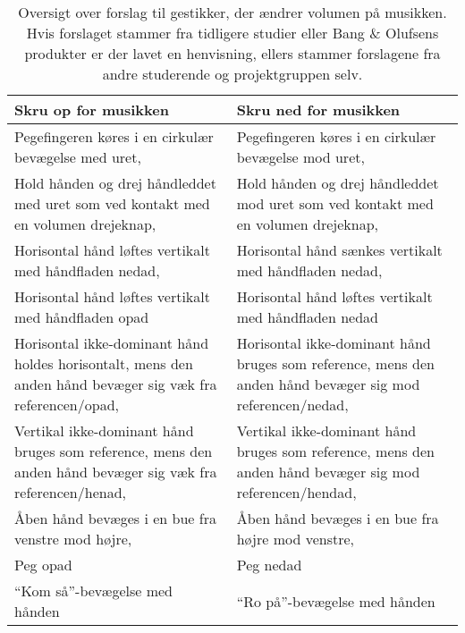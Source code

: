 %
\begin{table}[H]
	\centering
	\begin{tabular}{| p{6cm} | p{6cm} |}
		\hline
		\textbf{Skru op for musikken} & \textbf{Skru ned for musikken} \\ \hline
		Pegefingeren køres i en cirkulær bevægelse med uret, \parencite{WEB:BeosoundMoment, WEB:BMW7} & Pegefingeren køres i en cirkulær bevægelse mod uret, \parencite{WEB:BeosoundMoment, WEB:BMW7} \\ \hline
		Hold hånden og drej håndleddet med uret som ved kontakt med en volumen drejeknap, \parencite{WEB:Beosound2} & Hold hånden og drej håndleddet mod uret som ved kontakt med en volumen drejeknap, \parencite{WEB:Beosound2} \\ \hline
		Horisontal hånd løftes vertikalt med håndfladen nedad, \parencite[s. 166]{PDF:ComparingInputModalities} & Horisontal hånd sænkes vertikalt med håndfladen nedad, \parencite[s. 166]{PDF:ComparingInputModalities} \\ \hline
		Horisontal hånd løftes vertikalt med håndfladen opad & Horisontal hånd løftes vertikalt med håndfladen nedad \\ \hline
		Horisontal ikke-dominant hånd holdes horisontalt, mens den anden hånd bevæger sig væk fra referencen/opad, \parencite[s. 48]{PDF:UserDefinedGesturesTV} & Horisontal ikke-dominant hånd bruges som reference, mens den anden hånd bevæger sig mod referencen/nedad, \parencite[s. 48]{PDF:UserDefinedGesturesTV} \\ \hline
		Vertikal ikke-dominant hånd bruges som reference, mens den anden hånd bevæger sig væk fra referencen/henad, \parencite[s. 48]{PDF:UserDefinedGesturesTV} & Vertikal ikke-dominant hånd bruges som reference, mens den anden hånd bevæger sig mod referencen/hendad, \parencite[s. 48]{PDF:UserDefinedGesturesTV} \\ \hline
		Åben hånd bevæges i en bue fra venstre mod højre, \parencite{WEB:BeoplayA9} & Åben hånd bevæges i en bue fra højre mod venstre, \parencite{WEB:BeoplayA9} \\ \hline
		Peg opad & Peg nedad \\ \hline
		\enquote{Kom så}-bevægelse med hånden & \enquote{Ro på}-bevægelse med hånden \\ \hline		
	\end{tabular}
	\caption{Oversigt over forslag til gestikker, der ændrer volumen på musikken. Hvis forslaget stammer fra tidligere studier eller Bang $\&$ Olufsens produkter er der lavet en henvisning, ellers stammer forslagene fra andre studerende og projektgruppen selv.}
	\label{tab:IndsamledeGestikkerVolumen}
\end{table}
